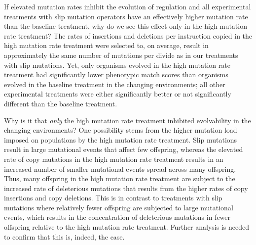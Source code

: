 If elevated mutation rates %
inhibit the evolution of regulation and all experimental treatments with slip mutation operators have an effectively higher mutation rate than the baseline treatment, why do we see this effect only in the high mutation rate treatment? The rates of insertions and deletions per instruction copied in the high mutation rate treatment were selected to, on average, result in approximately the same number of mutations per divide as in our treatments with slip mutations. Yet, only organisms evolved in the high mutation rate treatment had significantly lower phenotypic match scores than organisms evolved in the baseline treatment in the changing environments; all other experimental treatments were either significantly better or not significantly different than the baseline treatment.

Why is it that \textit{only} the high mutation rate treatment inhibited evolvability in the changing environments?
One possibility stems from the higher mutation load imposed on populations by the high mutation rate treatment.
Slip mutations result in large mutational events that affect few offspring, whereas the elevated rate of copy mutations in the high mutation rate treatment results in an increased number of smaller mutational events spread across many offspring.
Thus, many offspring in the high mutation rate treatment are subject to the increased rate of deleterious mutations that results from the higher rates of copy insertions and copy deletions. This is in contrast to treatments with slip mutations where relatively fewer offspring are subjected to large mutational events, which results in the concentration of deleterious mutations in fewer offspring relative to the high mutation rate treatment.
Further analysis is needed to confirm that this is, indeed, the case.

